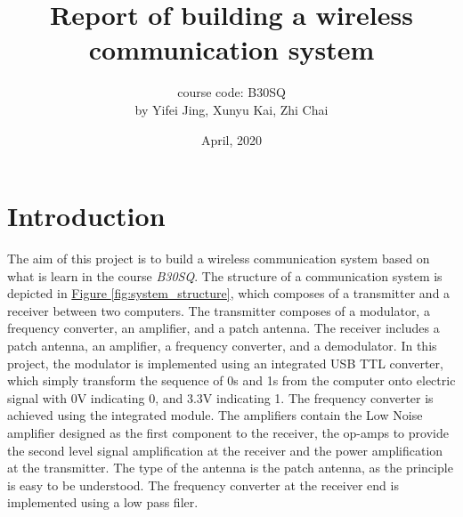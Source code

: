 \documentclass[12pt,a4paper]{report}
\begin{document}
    \title{Report of building a wireless communication system}

    \author{course code: B30SQ \\ by Yifei Jing, Xunyu Kai, Zhi Chai}
    \date{April, 2020}
    \maketitle
    \setlength\parindent{0pt}

    \cleardoublepage  
    \tableofcontents

    \cleardoublepage  
    \listoffigures

    \cleardoublepage  
    \listoftables

\chapter{Introduction}
The aim of this project is to build a wireless communication system based on what is learn in the course \emph{B30SQ}.
The structure of a communication system is depicted in \hyperref[fig:system_structure]{Figure \ref*{fig:system_structure}}, which composes of a transmitter and a receiver between two computers.
The transmitter composes of a modulator, a frequency converter, an amplifier, and a patch antenna. The receiver includes a patch antenna, an amplifier, a frequency converter, and a demodulator.
In this project, the modulator is implemented using an integrated USB TTL converter, which simply transform the sequence of 0s and 1s from the computer onto electric signal with 0V indicating 0, and 3.3V indicating 1. The frequency converter is achieved using the integrated module.
The amplifiers contain the Low Noise amplifier designed as the first component to the receiver, the op-amps to provide the second level signal amplification at the receiver and the power amplification at the transmitter.
The type of the antenna is the patch antenna, as the principle is easy to be understood. The frequency converter at the receiver end is implemented using a low pass filer.
\end{document}
